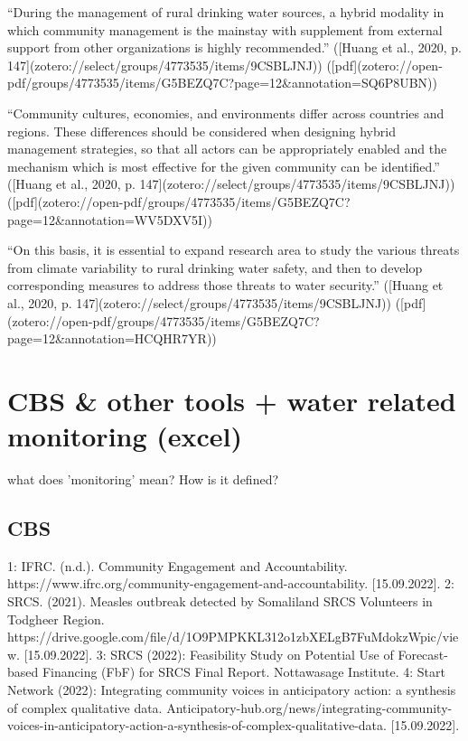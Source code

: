 {“During the management of rural drinking water sources, a hybrid modality in which community management is the mainstay with supplement from external support from other organizations is highly recommended.” ([Huang et al., 2020, p. 147](zotero://select/groups/4773535/items/9CSBLJNJ)) ([pdf](zotero://open-pdf/groups/4773535/items/G5BEZQ7C?page=12&annotation=SQ6P8UBN))

“Community cultures, economies, and environments differ across countries and regions. These differences should be considered when designing hybrid management strategies, so that all actors can be appropriately enabled and the mechanism which is most effective for the given community can be identified.” ([Huang et al., 2020, p. 147](zotero://select/groups/4773535/items/9CSBLJNJ)) ([pdf](zotero://open-pdf/groups/4773535/items/G5BEZQ7C?page=12&annotation=WV5DXV5I))

“On this basis, it is essential to expand research area to study the various threats from climate variability to rural drinking water safety, and then to develop corresponding measures to address those threats to water security.” ([Huang et al., 2020, p. 147](zotero://select/groups/4773535/items/9CSBLJNJ)) ([pdf](zotero://open-pdf/groups/4773535/items/G5BEZQ7C?page=12&annotation=HCQHR7YR))



\section{CBS & other tools + water related monitoring (excel)}

what does 'monitoring' mean? How is it defined?

\subsection{CBS}
1: IFRC. (n.d.). Community Engagement and Accountability. https://www.ifrc.org/community-engagement-and-accountability. [15.09.2022].
2: SRCS. (2021). Measles outbreak detected by Somaliland SRCS Volunteers in Todgheer Region. https://drive.google.com/file/d/1O9PMPKKL312o1zbXELgB7FuMdokzWpic/view. [15.09.2022].
3: SRCS (2022): Feasibility Study on Potential Use of Forecast-based Financing (FbF) for SRCS Final Report. Nottawasage Institute.
4: Start Network (2022): Integrating community voices in anticipatory action: a synthesis of complex qualitative data. Anticipatory-hub.org/news/integrating-community-voices-in-anticipatory-action-a-synthesis-of-complex-qualitative-data. [15.09.2022].

}
